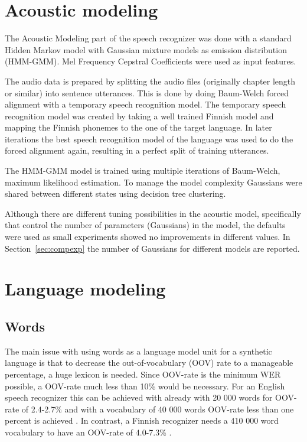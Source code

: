 \documentclass[b5paper]{article}
\begin{document}
\section{Acoustic modeling}
\label{sec:align}
The Acoustic Modeling part of the speech recognizer was done with a standard Hidden Markov model with Gaussian mixture models as emission distribution (HMM-GMM). Mel Frequency Cepstral Coefficients were used as input features. 

The audio data is prepared by splitting the audio files (originally chapter length or similar) into sentence utterances. This is done by doing Baum-Welch forced alignment with a temporary speech recognition model. The temporary speech recognition model was created by taking a well trained Finnish model and mapping the Finnish phonemes to the one of the target language. In later iterations the best speech recognition model of the language was used to do the forced alignment again, resulting in a perfect split of training utterances.

The HMM-GMM model is trained using multiple iterations of Baum-Welch, maximum likelihood estimation. To manage the model complexity Gaussians were shared between different states using decision tree clustering.

Although there are different tuning possibilities in the acoustic model, specifically that control the number of parameters (Gaussians) in the model, the defaults were used as small experiments showed no improvements in different values. In Section~\ref{sec:compexp} the number of Gaussians for different models are reported.


\section{Language modeling}

\subsection{Words}

The main issue with using words as a language model unit for a synthetic language is that to decrease the out-of-vocabulary (OOV) rate to a manageable percentage, a huge lexicon is needed. Since OOV-rate is the minimum WER possible, a OOV-rate much less than 10\% would be necessary. For an English speech recognizer this can be achieved with already with 20 000 words for OOV-rate of 2.4-2.7\% and with a vocabulary of 40 000 words OOV-rate less than one percent is achieved \cite{woodland19951994}. In contrast, a Finnish recognizer needs a 410 000 word vocabulary to have an OOV-rate of 4.0-7.3\% \cite{hirsimaki2006unlimited}.
\end{document}
